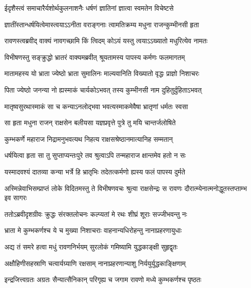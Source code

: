 \twolineshloka
{ईदृशैस्त्वं समाचारैर्यशोर्थकुलनाशनैः}
{धर्षणं ज्ञातिनां ज्ञात्वा स्वमतेन विचेष्टसे} %

\twolineshloka
{ज्ञातींस्तान्धर्षयित्वेमास्त्वयाऽऽनीता वराङ्गनाः}
{त्वामतिक्रम्य मधुना राजन्कुम्भीनसी हृता} %

\twolineshloka
{रावणस्त्वब्रवीद् वाक्यं नावगच्छामि किं त्विदम्}
{कोऽयं यस्तु त्वयाऽऽख्यातो मधुरित्येव नामतः} %

\twolineshloka
{विभीषणस्तु सङ्क्रुद्धो भ्रातरं वाक्यमब्रवीत्}
{श्रूयतामस्य पापस्य कर्मणः फलमागतम्} %

\twolineshloka
{मातामहस्य यो भ्राता ज्येष्ठो भ्राता सुमालिनः}
{माल्यवानिति विख्यातो वृद्धः प्राज्ञो निशाचरः} %

\twolineshloka
{पिता ज्येष्ठो जनन्या नो ह्यस्माकं चार्यकोऽभवत्}
{तस्य कुम्भीनसी नाम दुहितुर्दुहिताऽभवत्} %

\twolineshloka
{मातृष्वसुरथास्माकं सा च कन्याऽनलोद्भवा}
{भवत्यस्माकमेवैषा भ्रातृणां धर्मतः स्वसा} %

\twolineshloka
{सा हृता मधुना राजन् राक्षसेन बलीयसा}
{यज्ञप्रवृत्ते पुत्रे तु मयि चान्तर्जलोषिते} %

\twolineshloka
{कुम्भकर्णे महाराज निद्रामनुभवत्यथ}
{निहत्य राक्षसश्रेष्ठानमात्यानिह सम्मतान्} %

\twolineshloka
{धर्षयित्वा हृता सा तु सुप्ताप्यन्तःपुरे तव}
{श्रुत्वाऽपि तन्महाराज क्षान्तमेव हतो न सः} %

\twolineshloka
{यस्मादवश्यं दातव्या कन्या भर्त्रे हि भ्रातृभिः}
{तदेतत्कर्मणो ह्यस्य फलं पापस्य दुर्मते} %

\threelineshloka
{अस्मिन्नेवाभिसम्प्राप्तं लोके विदितमस्तु ते}
{विभीषणवचः श्रुत्वा राक्षसेन्द्रः स रावणः}
{दौरात्म्येनात्मनोद्धूतस्तप्ताम्भ इव सागरः} %

\twolineshloka
{ततोऽब्रवीदृशग्रीवः क्रुद्धः संरक्तलोचनः}
{कल्प्यतां मे रथः शीघ्रं शूराः सज्जीभवन्तु नः} %

\twolineshloka
{भ्राता मे कुम्भकर्णश्च ये च मुख्या निशाचराः}
{वाहनान्यधिरोहन्तु नानाप्रहरणायुधाः} %

\twolineshloka
{अद्य तं समरे हत्वा मधुं रावणनिर्भयम्}
{सुरलोकं गमिष्यामि युद्धकाङ्क्षी सुहृद्वृतः} %

\twolineshloka
{अक्षौहिणीसहस्राणि चत्वार्यग्र्याणि रक्षसाम्}
{नानाप्रहरणान्याशु निर्ययुर्युद्धकाङ्क्षिणाम्} %

\twolineshloka
{इन्द्रजित्त्वग्रतः अग्रतः सैन्यात्सैनिकान् परिगृह्य च}
{जगाम रावणो मध्ये कुम्भकर्णश्च पृष्ठतः} %

